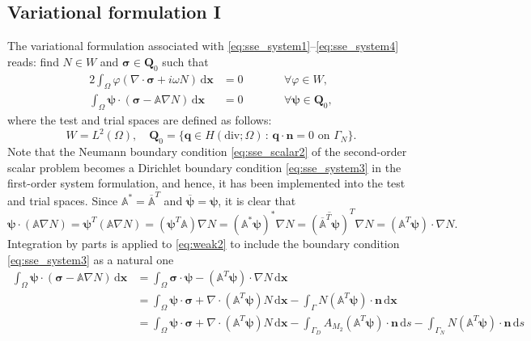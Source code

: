 \documentclass[11pt,a4paper]{article}
\begin{document}
\subsection{Variational formulation I}
The variational formulation associated with \eqref{eq:sse_system1}--\eqref{eq:sse_system4} reads: find $N\in W$ and $\boldsymbol{\sigma}\in\mathbf{Q}_0$ such that 
\begin{alignat}{2}
\int_\Omega\varphi\left(\nabla\cdot\boldsymbol{\sigma}+i\omega N\right)\,\mathrm{d}\mathbf{x}&=0 \qquad && \forall \varphi\in W,
\label{eq:weak1}\\
\int_\Omega\boldsymbol{\psi}\cdot\left(\boldsymbol{\sigma}-\mathbb{A}\nabla N\right)\,\mathrm{d}\mathbf{x}&=0 \qquad && \forall \boldsymbol{\psi}\in \mathbf{Q}_0,
\label{eq:weak2}
\end{alignat}
where the test and trial spaces are defined as follows:
\begin{equation}
W=L^2(\Omega),\quad
\mathbf{Q}_0=\{\mathbf{q}\in H(\text{div};\Omega)\,:\,\mathbf{q}\cdot\mathbf{n}=0 \text{ on }\Gamma_N\}.
\end{equation}
Note that the Neumann boundary condition \eqref{eq:sse_scalar2} of the second-order scalar problem becomes a Dirichlet boundary condition \eqref{eq:sse_system3} in the first-order system formulation, and hence, it has been implemented into the test and trial spaces. Since $\mathbb{A}^*=\overline{\mathbb{A}}^T$ and $\overline{\boldsymbol{\psi}}=\boldsymbol{\psi}$, it is clear that
\begin{equation}
\boldsymbol{\psi}\cdot(\mathbb{A}\nabla N)
=\boldsymbol{\psi}^T(\mathbb{A}\nabla N)
=(\boldsymbol{\psi}^T\mathbb{A})\nabla N
=(\mathbb{A}^*\boldsymbol{\psi})^*\nabla N
=\overline{\left(\overline{\mathbb{A}}^T\boldsymbol{\psi}\right)}^T\nabla N
=(\mathbb{A}^T\boldsymbol{\psi})\cdot\nabla N.
\end{equation}
Integration by parts is applied to \eqref{eq:weak2} to include the boundary condition \eqref{eq:sse_system3} as a natural one
\begin{align*}
\int_\Omega\boldsymbol{\psi}\cdot(\boldsymbol{\sigma}-\mathbb{A}\nabla N)\,\mathrm{d}\mathbf{x}
&=\int_\Omega\boldsymbol{\sigma}\cdot\boldsymbol{\psi}-(\mathbb{A}^T\boldsymbol{\psi})\cdot\nabla N\,\mathrm{d}\mathbf{x}\\
&=\int_\Omega\boldsymbol{\psi}\cdot\boldsymbol{\sigma}+\nabla\cdot(\mathbb{A}^T\boldsymbol{\psi})N\,\mathrm{d}\mathbf{x}-\int_\Gamma N(\mathbb{A}^T\boldsymbol{\psi})\cdot\mathbf{n}\,\mathrm{d}\mathbf{x}\\
&=\int_\Omega\boldsymbol{\psi}\cdot\boldsymbol{\sigma}+\nabla\cdot(\mathbb{A}^T\boldsymbol{\psi})N\,\mathrm{d}\mathbf{x}-\int_{\Gamma_D} A_{M_2}(\mathbb{A}^T\boldsymbol{\psi})\cdot\mathbf{n}\,\mathrm{d}s-\int_{\Gamma_N} N(\mathbb{A}^T\boldsymbol{\psi})\cdot\mathbf{n}\,\mathrm{d}s
\end{align*}
\end{document}
